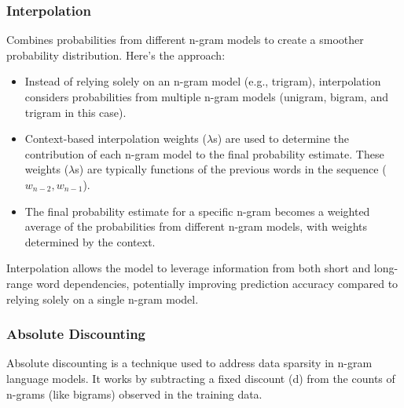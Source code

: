 \documentclass[12pt]{article}
\begin{document}
        \subsubsection{Interpolation}
            Combines probabilities from different n-gram models to create a smoother probability distribution. Here's the approach:
            \begin{itemize}
                \item Instead of relying solely on an n-gram model (e.g., trigram), interpolation considers probabilities from multiple n-gram models (unigram, bigram, and trigram in this case).
                \item Context-based interpolation weights ($\lambda$s) are used to determine the contribution of each n-gram model to the final probability estimate. These weights ($\lambda$s) are typically functions of the previous words in the sequence ($w_{n-2}, w_{n-1}$).
                \item The final probability estimate for a specific n-gram becomes a weighted average of the probabilities from different n-gram models, with weights determined by the context.
            \end{itemize}
            Interpolation allows the model to leverage information from both short and long-range word dependencies, potentially improving prediction accuracy compared to relying solely on a single n-gram model.
        
        \subsubsection{Absolute Discounting}
            Absolute discounting is a technique used to address data sparsity in n-gram language models. It works by subtracting a fixed discount (d) from the counts of n-grams (like bigrams) observed in the training data.
            
\end{document}
